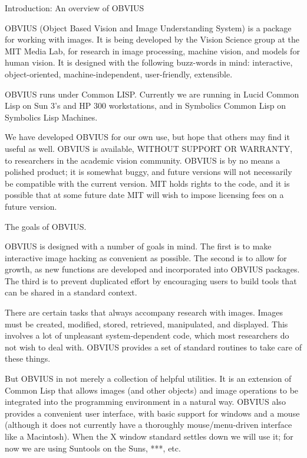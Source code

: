 Introduction: An overview of OBVIUS

OBVIUS (Object Based Vision and Image Understanding System) is a
package for working with images.  It is being developed by the Vision
Science group at the MIT Media Lab, for research in image processing,
machine vision, and models for human vision.  It is designed with the
following buzz-words in mind: interactive, object-oriented,
machine-independent, user-friendly, extensible.

OBVIUS runs under Common LISP.  Currently we are running in Lucid Common Lisp
on Sun 3's and HP 300 workstations, and in Symbolics Common Lisp on
Symbolics Lisp Machines.

We have developed OBVIUS for our own use, but hope that others may
find it useful as well.  OBVIUS is available, WITHOUT SUPPORT OR
WARRANTY, to researchers in the academic vision community.  OBVIUS is
by no means a polished product; it is somewhat buggy, and future versions
will not necessarily be compatible with the current version. MIT holds
rights to the code, and it is possible that at some future date MIT
will wish to impose licensing fees on a future version.


The goals of OBVIUS.

OBVIUS is designed with a number of goals in mind.  The first is to
make interactive image hacking as convenient as possible.  The second
is to allow for growth, as new functions are developed and
incorporated into OBVIUS packages.  The third is to prevent duplicated
effort by encouraging users to build tools that can be shared in
a standard context.

There are certain tasks that always accompany research with images.
Images must be created, modified, stored, retrieved, manipulated,
and displayed.  This involves a lot of unpleasant system-dependent
code, which most researchers do not wish to deal with.  OBVIUS
provides a set of standard routines to take care of these things.

But OBVIUS in not merely a collection of helpful utilities.  It is an
extension of Common Lisp that allows images (and other objects)
and image operations to be integrated into the programming environment
in a natural way.  OBVIUS also provides a convenient user interface,
with basic support for windows and a mouse (although it does not currently
have a thoroughly mouse/menu-driven interface like a Macintosh).  When
the X window standard settles down we will use it; for now we are using
Suntools on the Suns, ***, etc.

